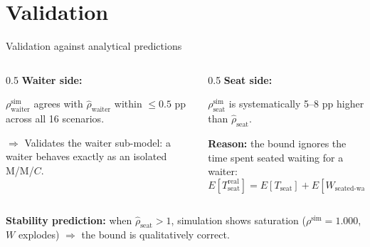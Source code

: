 \documentclass[10pt,aspectratio=169]{beamer}
\begin{document}
\section{Validation}
\begin{frame}{Validation against analytical predictions}
\begin{columns}[T]
\begin{column}{0.5\textwidth}
\textbf{Waiter side:}

$\rho_{\text{waiter}}^{\text{sim}}$ agrees with $\hat\rho_{\text{waiter}}$
within \alert{$\le 0.5$ pp} across all 16 scenarios.

\vspace{0.3cm}
$\Rightarrow$ Validates the waiter sub-model: a waiter behaves exactly as an isolated M/M/$C$.
\end{column}
\begin{column}{0.5\textwidth}
\textbf{Seat side:}

$\rho_{\text{seat}}^{\text{sim}}$ is systematically \alert{5--8 pp higher} than $\hat\rho_{\text{seat}}$.

\vspace{0.3cm}
\textbf{Reason:} the bound ignores the time spent seated waiting for a waiter:
\[
E[T_{\text{seat}}^{\text{real}}] = E[T_{\text{seat}}] + E[W_{\text{seated-waiting}}]
\]
\end{column}
\end{columns}

\vspace{0.4cm}
\begin{center}
\end{center}

\vspace{0.3cm}
\textbf{Stability prediction:} when $\hat\rho_{\text{seat}} > 1$, simulation
shows saturation ($\rho^{\text{sim}} = 1.000$, $W$ explodes) $\Rightarrow$
the bound is qualitatively correct.
\end{frame}

\end{document}
